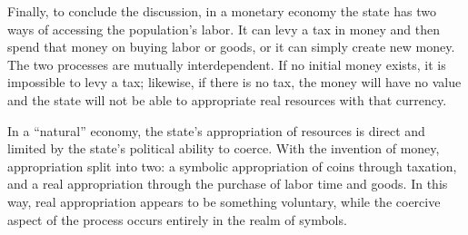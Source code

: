 Finally, to conclude the discussion, in a monetary economy the state has two ways of accessing the population’s labor. It can levy a tax in money and then spend that money on buying labor or goods, or it can simply create new money. The two processes are mutually interdependent. If no initial money exists, it is impossible to levy a tax; likewise, if there is no tax, the money will have no value and the state will not be able to appropriate real resources with that currency.

In a “natural” economy, the state’s appropriation of resources is direct and limited by the state’s political ability to coerce. With the invention of money, appropriation split into two: a symbolic appropriation of coins through taxation, and a real appropriation through the purchase of labor time and goods. In this way, real appropriation appears to be something voluntary, while the coercive aspect of the process occurs entirely in the realm of symbols.

 